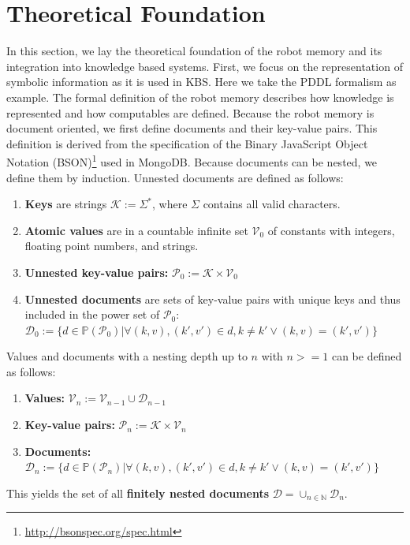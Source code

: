 \section{Theoretical Foundation}
\label{sec:formalism}
In this section, we lay the theoretical foundation of the robot memory
and its integration into knowledge based systems. First, we focus on
the representation of symbolic information as it is used in KBS. Here
we take the PDDL formalism as example. The formal definition of the
robot memory describes how knowledge is represented and how
computables are defined. Because the robot memory is document
oriented, we first define documents and their key-value pairs. This
definition is derived from the specification of the Binary JavaScript
Object Notation (BSON)\footnote{\url{http://bsonspec.org/spec.html}}
used in MongoDB.  Because documents can be nested, we define them by
induction. Unnested documents are defined as follows:
\begin{enumerate}
\item \textbf{Keys} are strings $\mathcal{K} := \Sigma^*$, where
  $\Sigma$ contains all valid characters.
\item  \textbf{Atomic values} are in a countable infinite set $\mathcal{V}_0$ of constants with
  integers, floating point numbers, and strings.
\item \textbf{Unnested key-value pairs:} $\mathcal{P}_0:=\mathcal{K}\times\mathcal{V}_0$
\item \textbf{Unnested documents} are sets of key-value pairs with
  unique keys and thus included in the power set of $\mathcal{P}_0$:\\
  $\mathcal{D}_0:=\{
  d\in\mathbb{P}(\mathcal{P}_0)|
  \forall (k,v),(k',v')\in d , k\neq k' \vee (k,v)=(k',v')
  \}$
\end{enumerate}
Values and documents with a nesting depth up to $n$ with $n>=1$ can be
defined as follows:
\begin{enumerate}
\item  \textbf{Values:} $\mathcal{V}_n := \mathcal{V}_{n-1} \cup \mathcal{D}_{n-1}$
\item \textbf{Key-value pairs:} $\mathcal{P}_n:=\mathcal{K}\times\mathcal{V}_n$
\item \textbf{Documents:}
  $\mathcal{D}_n:=\{
  d\in\mathbb{P}(\mathcal{P}_n)|
  \forall (k,v),(k',v')\in d , k\neq k' \vee (k,v)=(k',v')
  \}$
\end{enumerate}
This yields the set of all \textbf{finitely nested documents}
$\mathcal{D}=\cup_{n\in\mathbb{N}}\mathcal{D}_n$.
